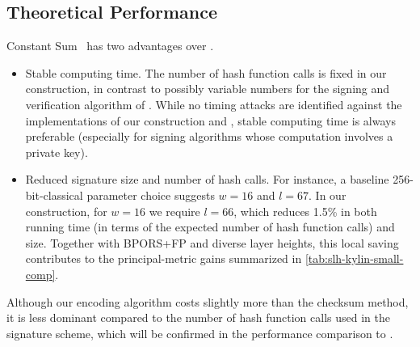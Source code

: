 \subsection{Theoretical Performance}
Constant Sum \WOTSP~has two advantages over \WOTSP.
\begin{itemize}
    \item Stable computing time.  The number of hash function calls is fixed in our construction, in contrast to possibly variable numbers for the signing and verification algorithm of \WOTSP. While no timing attacks are identified against the implementations of our construction and \WOTSP, stable computing time is always preferable (especially for signing algorithms whose computation involves a private key). 
    \item Reduced signature size and number of hash calls. For instance, a baseline 256-bit-classical parameter choice suggests $w=16$ and $l=67$. In our construction, for $w=16$ we require $l=66$, which reduces 1.5\% in both running time (in terms of the expected number of hash function calls) and size. Together with BPORS+FP and diverse layer heights, this local saving contributes to the principal-metric gains summarized in \cref{tab:slh-kylin-small-comp}.
\end{itemize}

Although our encoding algorithm costs slightly more than the checksum method, it is less dominant compared to the number of hash function calls used in the signature scheme, which will be confirmed in the performance comparison to \SPHINCSP.


 
